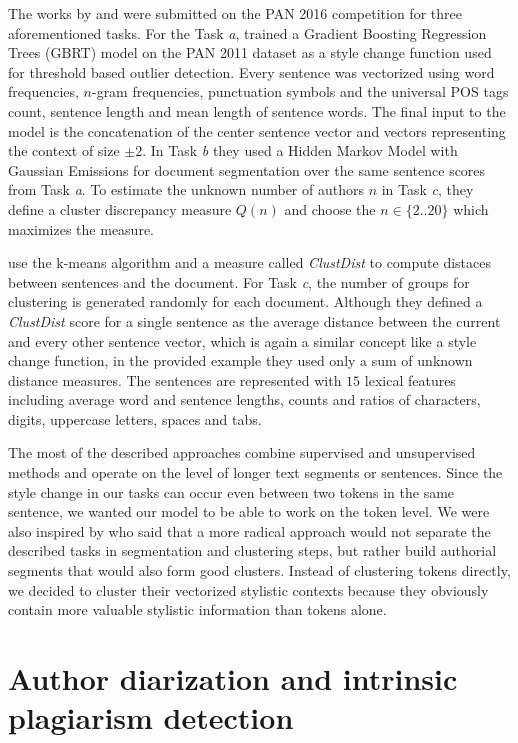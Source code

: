 \documentclass[10pt, a4paper]{article}
\begin{document}
The works by \citet{kuznetsov-2016} and \citet{sittar-2016} were submitted on the PAN 2016 competition for three aforementioned tasks. For the Task \emph{a}, \citet{kuznetsov-2016} trained a Gradient Boosting Regression Trees (GBRT) model on the PAN 2011 dataset as a style change function used for threshold based outlier detection. Every sentence was vectorized using word frequencies, $n$-gram frequencies, punctuation symbols and the universal POS tags count, sentence length and mean length of sentence words. The final input to the model is the concatenation of the center sentence vector and vectors representing the context of size $\pm2$. In Task \emph{b} they used a Hidden Markov Model with Gaussian Emissions for document segmentation over the same sentence scores from Task \emph{a}. To estimate the unknown number of authors $n$ in Task \emph{c}, they define a cluster discrepancy measure $Q(n)$ and choose the $n\in\{2..20\}$ which maximizes the measure.

\citet{sittar-2016} use the k-means algorithm and a measure called \emph{ClustDist} to compute distaces between sentences and the document. For Task \emph{c}, the number of groups for clustering is generated randomly for each document. Although they defined a \emph{ClustDist} score for a single sentence as the average distance between the current and every other sentence vector, which is again a similar concept like a style change function, in the provided example they used only a sum of unknown distance measures. The sentences are represented with $15$ lexical features including average word and sentence lengths, counts and ratios of characters, digits, uppercase letters, spaces and tabs. 

The most of the described approaches combine supervised and unsupervised methods and operate on the level of longer text segments or sentences. Since the style change in our tasks can occur even between two tokens in the same sentence, we wanted our model to be able to work on the token level. We were also inspired by \citet{brooke-2013} who said that a more radical approach would not separate the described tasks in segmentation and clustering steps, but rather build authorial segments that would also form good clusters. Instead of clustering tokens directly, we decided to cluster their vectorized stylistic contexts because they obviously contain more valuable stylistic information than tokens alone.

\section{Author diarization and intrinsic plagiarism detection} \label{sec:author-diraization}
\end{document}

